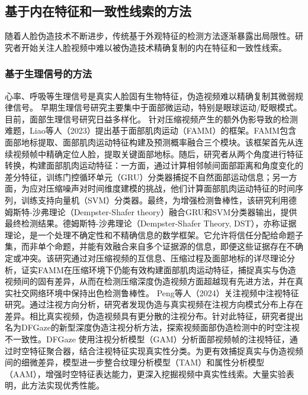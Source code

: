 \documentclass[conference]{IEEEtran}
\begin{document}
\subsection{基于内在特征和一致性线索的方法}
随着人脸伪造技术不断进步，传统基于外观特征的检测方法逐渐暴露出局限性。研究者开始关注人脸视频中难以被伪造技术精确复制的内在特征和一致性线索。

\subsubsection{基于生理信号的方法}
心率、呼吸等生理信号是真实人脸固有生物特征，伪造视频难以精确复制其微弱规律信号。
早期生理信号研究主要集中于面部微运动，特别是眼球运动/眨眼模式\cite{Y.M.-426}。目前，面部生理信号研究日益多样化。
针对压缩视频产生的额外伪影导致的检测难题，Liao等人（2023）提出基于面部肌肉运动（FAMM）的框架。FAMM包含面部地标提取、面部肌肉运动特征构建及预测概率融合三个模块。该框架首先从连续视频帧中精确定位人脸，提取关键面部地标。随后，研究者从两个角度进行特征转换，构建面部肌肉运动特征：一方面，通过计算相邻帧间面部距离和角度变化的差分特征，训练门控循环单元（GRU）分类器捕捉不自然面部运动信息；另一方面，为应对压缩噪声对时间维度建模的挑战，他们计算面部肌肉运动特征的时间序列，训练支持向量机（SVM）分类器。最终，为增强检测鲁棒性，该研究利用德姆斯特-沙弗理论（Dempster-Shafer theory）融合GRU和SVM分类器输出，提供最终检测结果。德姆斯特-沙弗理论（Dempster-Shafer Theory, DST）\cite{Shafer1976}，亦称证据理论，是一个处理不确定性和不精确信息的数学框架。它允许将信任分配给命题子集，而非单个命题，并能有效融合来自多个证据源的信息，即便这些证据存在不确定或冲突。该研究通过对压缩视频的互信息、压缩过程及面部地标的详尽理论分析，证实FAMM在压缩环境下仍能有效构建面部肌肉运动特征，捕捉真实与伪造视频间的固有差异，从而在检测压缩深度伪造视频方面超越现有先进方法，并在真实社交网络环境中保持出色检测鲁棒性\cite{LiaoWang-137}。
Peng等人（2024）关注视频中注视特征研究。通过注视方向分析，研究者发现伪造与真实视频在注视方向模式分布上存在差异。相比真实视频，伪造视频具有更分散的注视分布。针对此特征，研究者提出名为DFGaze的新型深度伪造注视分析方法，探索视频面部伪造检测中的时空注视不一致性。DFGaze 使用注视分析模型（GAM）分析面部视频帧的注视特征，通过时空特征聚合器，结合注视特征实现真实性分类。为更有效捕捉真实与伪造视频间的细微差异，模型进一步整合纹理分析模型（TAM）和属性分析模型（AAM），增强时空特征表达能力，更深入挖掘视频中真实性线索。大量实验表明，此方法实现优秀性能\cite{PengMiao-144}。
\end{document}
